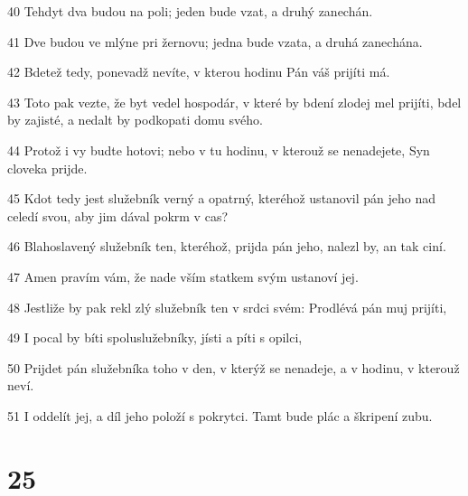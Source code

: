 \par 40 Tehdyt dva budou na poli; jeden bude vzat, a druhý zanechán.
\par 41 Dve budou ve mlýne pri žernovu; jedna bude vzata, a druhá zanechána.
\par 42 Bdetež tedy, ponevadž nevíte, v kterou hodinu Pán váš prijíti má.
\par 43 Toto pak vezte, že byt vedel hospodár, v které by bdení zlodej mel prijíti, bdel by zajisté, a nedalt by podkopati domu svého.
\par 44 Protož i vy budte hotovi; nebo v tu hodinu, v kterouž se nenadejete, Syn cloveka prijde.
\par 45 Kdot tedy jest služebník verný a opatrný, kteréhož ustanovil pán jeho nad celedí svou, aby jim dával pokrm v cas?
\par 46 Blahoslavený služebník ten, kteréhož, prijda pán jeho, nalezl by, an tak ciní.
\par 47 Amen pravím vám, že nade vším statkem svým ustanoví jej.
\par 48 Jestliže by pak rekl zlý služebník ten v srdci svém: Prodlévá pán muj prijíti,
\par 49 I pocal by bíti spoluslužebníky, jísti a píti s opilci,
\par 50 Prijdet pán služebníka toho v den, v kterýž se nenadeje, a v hodinu, v kterouž neví.
\par 51 I oddelít jej, a díl jeho položí s pokrytci. Tamt bude plác a škripení zubu.

\chapter{25}


